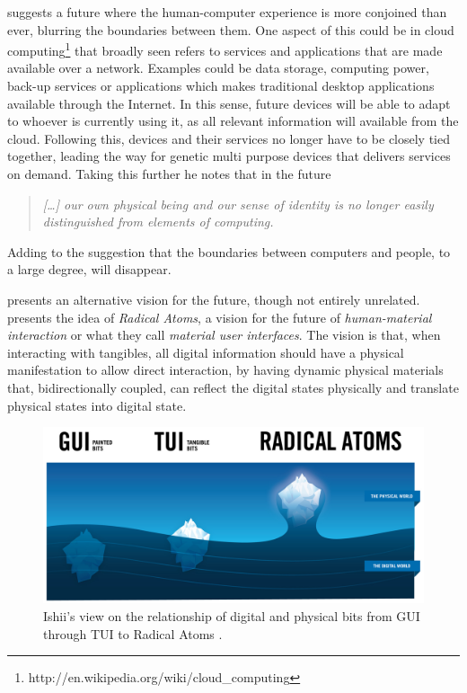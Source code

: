 \citeauthor{abowd2012next} suggests a future where the human-computer experience is more conjoined than ever, blurring the boundaries between them.
One aspect of this could be in cloud computing\footnote{http://en.wikipedia.org/wiki/cloud\_computing} that broadly seen refers to services and applications that are made available over a network.
Examples could be data storage, computing power, back-up services or applications which makes traditional desktop applications available through the Internet.
In this sense, future devices will be able to adapt to whoever is currently using it, as all relevant information will available from the cloud.
Following this, devices and their services no longer have to be closely tied together, leading the way for genetic multi purpose devices that delivers services on demand.
Taking this further he notes that in the future
\begin{quote}
\emph{[\ldots] our own physical being and our sense of identity is no longer easily distinguished from elements of computing.}
\end{quote}
Adding to the suggestion that the boundaries between computers and people, to a large degree, will disappear.

\citet{ishii2012radical} presents an alternative vision for the future, though not entirely unrelated.
\citeauthor{ishii2012radical} presents the idea of \textit{Radical Atoms}, a vision for the future of \textit{human-material interaction} or what they call \textit{material user interfaces}.
The vision is that, when interacting with tangibles, all digital information should have a physical manifestation to allow direct interaction, by having dynamic physical materials that, bidirectionally coupled, can reflect the digital states physically and translate physical states into digital state.

\begin{figure}[h]
  \centering
      \includegraphics[width=0.9\linewidth]{figures/radicalatoms}
  \caption{Ishii's view on the relationship of digital and physical bits from GUI through TUI to Radical Atoms \citep{ishii2012radical}.}
   \label{radicalatoms}
\end{figure}


